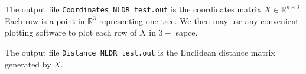 \documentclass[11pt]{article}
\begin{document}
The output file {\tt Coordinates\_NLDR\_test.out} is the coordinates matrix $X\in \mathbb{R}^{n\times 3}$. Each row is a point in $\mathbb{R}^3$ representing one tree. We then may use any convenient plotting software to plot each row of $X$ in $3-$ sapce.

The output file {\tt Distance\_NLDR\_test.out} is the Euclidean distance matrix generated by $X$.






\end{document}
